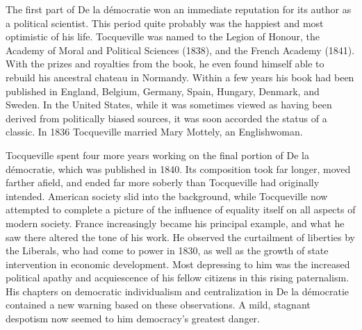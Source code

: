 \documentclass[12pt]{article}
\begin{document}
                                      The first part of De la d\'{e}mocratie won an immediate reputation for
                                      its author as a political scientist. This period quite probably was the
                                      happiest and most optimistic of his life. Tocqueville was named to
                                      the Legion of Honour, the Academy of Moral and Political Sciences
                                      (1838), and the French Academy (1841). With the prizes and royalties
                                      from the book, he even found himself able to rebuild his ancestral
                                      chateau in Normandy. Within a few years his book had been published
                                      in England, Belgium, Germany, Spain, Hungary, Denmark, and Sweden.
                                      In the United States, while it was sometimes viewed as having been
                                      derived from politically biased sources, it was soon accorded the
                                      status of a classic. In 1836 Tocqueville married Mary Mottely, an
                                      Englishwoman. 




                                      Tocqueville spent four more years working on the final portion of De
                                      la d\'{e}mocratie, which was published in 1840. Its composition took
                                      far longer, moved farther afield, and ended far more soberly than
                                      Tocqueville had originally intended. American society slid into the
                                      background, while Tocqueville now attempted to complete a picture of
                                      the influence of equality itself on all aspects of modern society.
                                      France increasingly became his principal example, and what he saw
                                      there altered the tone of his work. He observed the curtailment of
                                      liberties by the Liberals, who had come to power in 1830, as well as
                                      the growth of state intervention in economic development. Most
                                      depressing to him was the increased political apathy and
                                      acquiescence of his fellow citizens in this rising paternalism. His
                                      chapters on democratic individualism and centralization in De la
                                      d\'{e}mocratie contained a new warning based on these observations. A
                                      mild, stagnant despotism now seemed to him democracy's greatest
                                      danger. 
\end{document}
